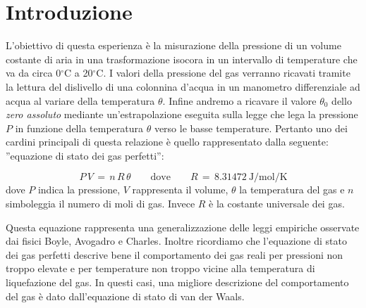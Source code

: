 \section{Introduzione}
L'obiettivo di questa esperienza è la misurazione della pressione di un volume costante di aria in una trasformazione isocora in un intervallo di temperature che va da circa 0$^\circ$C a 20$^\circ$C. I valori della pressione del gas verranno ricavati tramite la lettura del dislivello di una colonnina d'acqua in un manometro differenziale ad acqua al variare della temperatura $\theta$.
Infine andremo a ricavare il valore $\theta_0$ dello \emph{zero assoluto} mediante un'estrapolazione eseguita sulla legge che lega la pressione $P$ in funzione della temperatura $\theta$ verso le basse temperature.
Pertanto uno dei cardini principali di questa relazione è quello rappresentato dalla seguente: ''equazione di stato dei gas perfetti'':

\begin{equation}
	P \, V \,=\, n \, R \, \theta \quad\quad \text{dove} \quad\quad R \,=\, \SI{8.31472}{\joule\per\mole\per\kelvin}
	\label{eq:legge_stato_gas}
\end{equation}
%
dove $P$ indica la pressione, $V$ rappresenta il volume, $\theta$ la temperatura del gas e $n$ simboleggia il numero di moli di gas. Invece $R$ è la costante universale dei gas.

\bigskip
Questa equazione rappresenta una generalizzazione delle leggi empiriche osservate dai fisici Boyle, Avogadro e Charles. Inoltre ricordiamo che l'equazione di stato dei gas perfetti descrive bene il comportamento dei gas reali per pressioni non troppo elevate e per temperature non troppo vicine alla temperatura di liquefazione del gas. In questi casi, una migliore descrizione del comportamento del gas è dato dall'equazione di stato di van der Waals.
